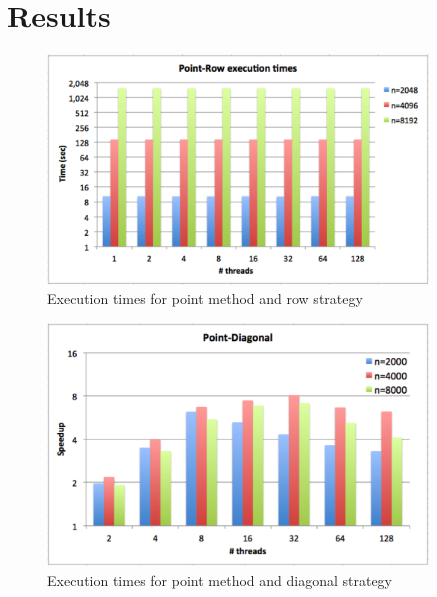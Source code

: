 \documentclass[../thesis]{subfiles}
\begin{document}
	\section{Results}
	\label{sec:multicore:results}

	\begin{figure}[hp]
		\begin{center}
			\includegraphics[width=0.9\textwidth]{assets/images/multicore/point-row.png}
		\end{center}
		\caption{Execution times for point method and row strategy}
		\label{fig:multicore:point:row:times}
	\end{figure}

	\begin{figure}[hp]
		\begin{center}
			\includegraphics[width=0.9\textwidth]{assets/images/multicore/point-diagonal.png}
		\end{center}
		\caption{Execution times for point method and diagonal strategy}
		\label{fig:multicore:point:diagonal:times}
	\end{figure}
\end{document}
